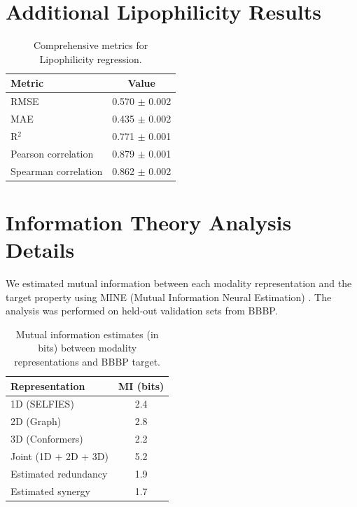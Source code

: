 \documentclass[11pt]{article}
\begin{document}
\section{Additional Lipophilicity Results}
\label{app:lipo}

\begin{table}[h]
    \centering
    \caption{Comprehensive metrics for Lipophilicity regression.}
    \begin{tabular}{lc}
        \toprule
        \textbf{Metric} & \textbf{Value} \\
        \midrule
        RMSE & 0.570 $\pm$ 0.002 \\
        MAE & 0.435 $\pm$ 0.002 \\
        R$^2$ & 0.771 $\pm$ 0.001 \\
        Pearson correlation & 0.879 $\pm$ 0.001 \\
        Spearman correlation & 0.862 $\pm$ 0.002 \\
        \bottomrule
    \end{tabular}
\end{table}

\section{Information Theory Analysis Details}
\label{app:info_theory}

We estimated mutual information between each modality representation and the target property using MINE (Mutual Information Neural Estimation) \citep{belghazi2018mutual}. The analysis was performed on held-out validation sets from BBBP.

\begin{table}[h]
    \centering
    \caption{Mutual information estimates (in bits) between modality representations and BBBP target.}
    \begin{tabular}{lc}
        \toprule
        \textbf{Representation} & \textbf{MI (bits)} \\
        \midrule
        1D (SELFIES) & 2.4 \\
        2D (Graph) & 2.8 \\
        3D (Conformers) & 2.2 \\
        \midrule
        Joint (1D + 2D + 3D) & 5.2 \\
        Estimated redundancy & 1.9 \\
        Estimated synergy & 1.7 \\
        \bottomrule
    \end{tabular}
\end{table}
\end{document}
